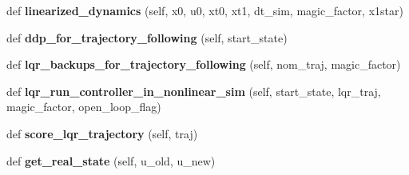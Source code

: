 \begin{DoxyCompactItemize}
def {\bfseries linearized\+\_\+dynamics} (self, x0, u0, xt0, xt1, dt\+\_\+sim, magic\+\_\+factor, x1star)
\item 
\hypertarget{classaml__lfd_1_1lqr_1_1ddp__traj__follow__base_1_1_d_d_p_traj_follow_a2d1424955071fed31760c8470e807443}{}\label{classaml__lfd_1_1lqr_1_1ddp__traj__follow__base_1_1_d_d_p_traj_follow_a2d1424955071fed31760c8470e807443} 
def {\bfseries ddp\+\_\+for\+\_\+trajectory\+\_\+following} (self, start\+\_\+state)
\item 
\hypertarget{classaml__lfd_1_1lqr_1_1ddp__traj__follow__base_1_1_d_d_p_traj_follow_a3006461df332f39b6d308988731d7182}{}\label{classaml__lfd_1_1lqr_1_1ddp__traj__follow__base_1_1_d_d_p_traj_follow_a3006461df332f39b6d308988731d7182} 
def {\bfseries lqr\+\_\+backups\+\_\+for\+\_\+trajectory\+\_\+following} (self, nom\+\_\+traj, magic\+\_\+factor)
\item 
\hypertarget{classaml__lfd_1_1lqr_1_1ddp__traj__follow__base_1_1_d_d_p_traj_follow_adf71108af75c7ae1f0637fa37f7b6e4c}{}\label{classaml__lfd_1_1lqr_1_1ddp__traj__follow__base_1_1_d_d_p_traj_follow_adf71108af75c7ae1f0637fa37f7b6e4c} 
def {\bfseries lqr\+\_\+run\+\_\+controller\+\_\+in\+\_\+nonlinear\+\_\+sim} (self, start\+\_\+state, lqr\+\_\+traj, magic\+\_\+factor, open\+\_\+loop\+\_\+flag)
\item 
\hypertarget{classaml__lfd_1_1lqr_1_1ddp__traj__follow__base_1_1_d_d_p_traj_follow_ad85bd52ed6c3718f4addcc61484442e3}{}\label{classaml__lfd_1_1lqr_1_1ddp__traj__follow__base_1_1_d_d_p_traj_follow_ad85bd52ed6c3718f4addcc61484442e3} 
def {\bfseries score\+\_\+lqr\+\_\+trajectory} (self, traj)
\item 
\hypertarget{classaml__lfd_1_1lqr_1_1ddp__traj__follow__base_1_1_d_d_p_traj_follow_a5572963f6a3096cfdf13ede535d06b85}{}\label{classaml__lfd_1_1lqr_1_1ddp__traj__follow__base_1_1_d_d_p_traj_follow_a5572963f6a3096cfdf13ede535d06b85} 
def {\bfseries get\+\_\+real\+\_\+state} (self, u\+\_\+old, u\+\_\+new)
\end{DoxyCompactItemize}
